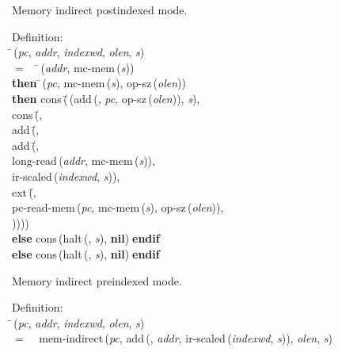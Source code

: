  Memory indirect postindexed mode.
\begin{tabbing}{\sc Definition}: \\  
\=\,({\it{pc\/}}, {\it{addr\/}}, {\it{indexwd\/}}, {\it{olen\/}}, {\it{s\/}}) \\ 
$=$$\;\;\;\;$\=\,({\it{addr\/}}, {\rm{mc-mem}}\,({\it{s\/}})) \\ 
{\bf then }\=\,({\it{pc\/}}, {\rm{mc-mem}}\,({\it{s\/}}), {\rm{op-sz}}\,({\it{olen\/}})) \\ 
{\bf then }{\rm{cons}}\,(\=\,({\rm{add}}\,({}, {\it{pc\/}}, {\rm{op-sz}}\,({\it{olen\/}})), {\it{s\/}}), \\ 
{\rm{cons}}\,(\=, \\ 
{\rm{add}}\,(\=, \\ 
{\rm{add}}\,(\=, \\ 
{\rm{long-read}}\,({\it{addr\/}}, {\rm{mc-mem}}\,({\it{s\/}})), \\ 
{\rm{ir-scaled}}\,({\it{indexwd\/}}, {\it{s\/}}))\-, \\ 
{\rm{ext}}\,(\=, \\ 
{\rm{pc-read-mem}}\,({\it{pc\/}}, {\rm{mc-mem}}\,({\it{s\/}}), {\rm{op-sz}}\,({\it{olen\/}})), \\ 
{})\-)\-)\-)\- \\ 
{\bf else }{\rm{cons}}\,({\rm{halt}}\,({}, {\it{s\/}}), {\bf{nil}})$\;${\bf  endif}\- \\ 
{\bf else }{\rm{cons}}\,({\rm{halt}}\,({}, {\it{s\/}}), {\bf{nil}})$\;${\bf  endif}\-\-
\end{tabbing}

 Memory indirect preindexed mode.
\begin{tabbing}{\sc Definition}: \\  
\=\,({\it{pc\/}}, {\it{addr\/}}, {\it{indexwd\/}}, {\it{olen\/}}, {\it{s\/}}) \\ 
$=$$\;\;\;\;${\rm{mem-indirect}}\,({\it{pc\/}}, {\rm{add}}\,({}, {\it{addr\/}}, {\rm{ir-scaled}}\,({\it{indexwd\/}}, {\it{s\/}})), {\it{olen\/}}, {\it{s\/}})\-
\end{tabbing}

